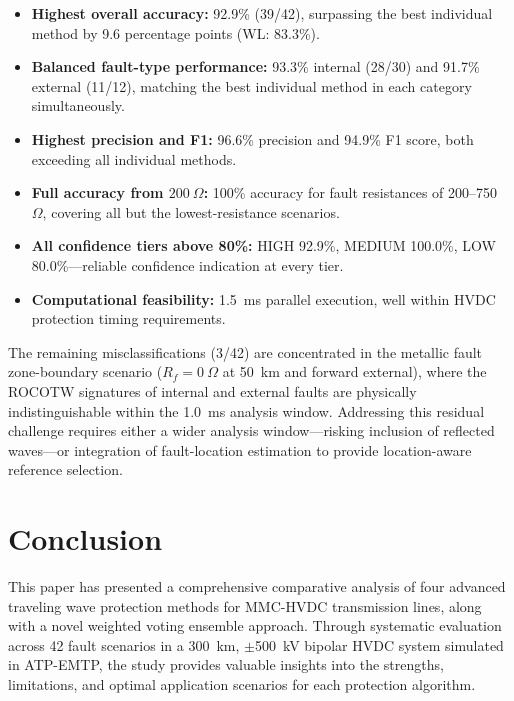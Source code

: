 \documentclass[journal]{IEEEtran}
\begin{document}
\begin{itemize}
    \item \textbf{Highest overall accuracy:} 92.9\% (39/42), surpassing
    the best individual method by 9.6 percentage points (WL: 83.3\%).

    \item \textbf{Balanced fault-type performance:} 93.3\% internal
    (28/30) and 91.7\% external (11/12), matching the best individual
    method in each category simultaneously.

    \item \textbf{Highest precision and F1:} 96.6\% precision and
    94.9\% F1 score, both exceeding all individual methods.

    \item \textbf{Full accuracy from $200~\Omega$:} 100\% accuracy
    for fault resistances of 200--750~$\Omega$, covering all but the
    lowest-resistance scenarios.

    \item \textbf{All confidence tiers above 80\%:} HIGH 92.9\%,
    MEDIUM 100.0\%, LOW 80.0\%---reliable confidence indication at
    every tier.

    \item \textbf{Computational feasibility:} 1.5~ms parallel
    execution, well within HVDC protection timing requirements.
\end{itemize}

The remaining misclassifications (3/42) are concentrated in the
metallic fault zone-boundary scenario ($R_f = 0~\Omega$ at 50~km and
forward external), where the ROCOTW signatures of internal and external
faults are physically indistinguishable within the 1.0~ms analysis
window. Addressing this residual challenge requires either a wider
analysis window---risking inclusion of reflected waves---or integration
of fault-location estimation to provide location-aware reference
selection.


\section{Conclusion}

This paper has presented a comprehensive comparative analysis of four advanced traveling wave protection methods for MMC-HVDC transmission lines, along with a novel weighted voting ensemble approach. Through systematic evaluation across 42 fault scenarios in a 300~km, $\pm$500~kV bipolar HVDC system simulated in ATP-EMTP, the study provides valuable insights into the strengths, limitations, and optimal application scenarios for each protection algorithm.
\end{document}
